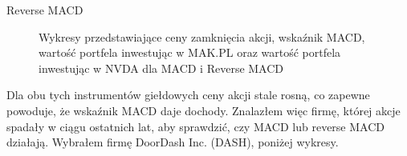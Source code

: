 \documentclass{article}
\begin{document}
\begin{section}{Reverse MACD}
\begin{figure}[H]
    \end{figure}
    \begin{figure}[H]
        \caption{Wykresy przedstawiające ceny zamknięcia akcji, wskaźnik MACD, wartość portfela inwestując w MAK.PL oraz wartość portfela inwestując w NVDA dla MACD i Reverse MACD}
    \end{figure}
    Dla obu tych instrumentów giełdowych ceny akcji stale rosną, co zapewne powoduje, że wskaźnik MACD daje dochody. Znalazłem więc firmę, której akcje
    spadały w ciągu ostatnich lat, aby sprawdzić, czy MACD lub reverse MACD działają. Wybrałem firmę DoorDash Inc. (DASH), poniżej wykresy.


\end{section}
\end{document}
